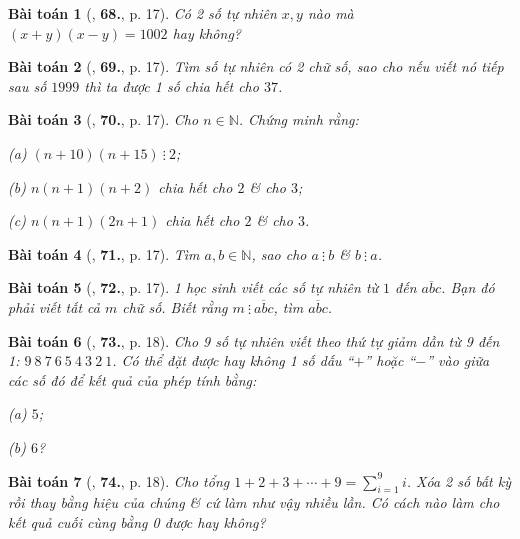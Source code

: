 \documentclass{article}
\numberwithin{equation}{section}
\newtheorem{baitoan}{Bài toán}[section]
\begin{document}
\begin{baitoan}[\cite{Binh_Toan_6_tap_1}, \textbf{68.}, p. 17]
	Có 2 số tự nhiên $x,y$ nào mà $(x + y)(x - y) = 1002$ hay không?
\end{baitoan}

\begin{baitoan}[\cite{Binh_Toan_6_tap_1}, \textbf{69.}, p. 17]
	Tìm số tự nhiên có 2 chữ số, sao cho nếu viết nó tiếp sau số $1999$ thì ta được 1 số chia hết cho $37$.
\end{baitoan}

\begin{baitoan}[\cite{Binh_Toan_6_tap_1}, \textbf{70.}, p. 17]
	Cho $n\in\mathbb{N}$. Chứng minh rằng:
	\begin{enumerate*}
		\item[(a)] $(n + 10)(n + 15)\ \vdots\ 2$;
		\item[(b)] $n(n + 1)(n + 2)$ chia hết cho $2$ \& cho $3$;
		\item[(c)] $n(n + 1)(2n + 1)$ chia hết cho $2$ \& cho $3$. 
	\end{enumerate*}
\end{baitoan}

\begin{baitoan}[\cite{Binh_Toan_6_tap_1}, \textbf{71.}, p. 17]
	Tìm $a,b\in\mathbb{N}$, sao cho $a\ \vdots\ b$ \& $b\ \vdots\ a$.
\end{baitoan}

\begin{baitoan}[\cite{Binh_Toan_6_tap_1}, \textbf{72.}, p. 17]
	1 học sinh viết các số tự nhiên từ $1$ đến $\overline{abc}$. Bạn đó phải viết tất cả $m$ chữ số. Biết rằng $m\ \vdots\ \overline{abc}$, tìm $\overline{abc}$.
\end{baitoan}

\begin{baitoan}[\cite{Binh_Toan_6_tap_1}, \textbf{73.}, p. 18]
	Cho 9 số tự nhiên viết theo thứ tự giảm dần từ 9 đến 1: $9\ 8\ 7\ 6\ 5\ 4\ 3\ 2\ 1$. Có thể đặt được hay không 1 số dấu ``$+$'' hoặc ``$-$'' vào giữa các số đó để kết quả của phép tính bằng:
	\begin{enumerate*}
		\item[(a)] $5$;
		\item[(b)] $6$?
	\end{enumerate*}
\end{baitoan}

\begin{baitoan}[\cite{Binh_Toan_6_tap_1}, \textbf{74.}, p. 18]
	Cho tổng $1 + 2 + 3 + \cdots + 9 = \sum_{i=1}^9 i$. Xóa 2 số bất kỳ rồi thay bằng hiệu của chúng \& cứ làm như vậy nhiều lần. Có cách nào làm cho kết quả cuối cùng bằng 0 được hay không?
\end{baitoan}
\end{document}
